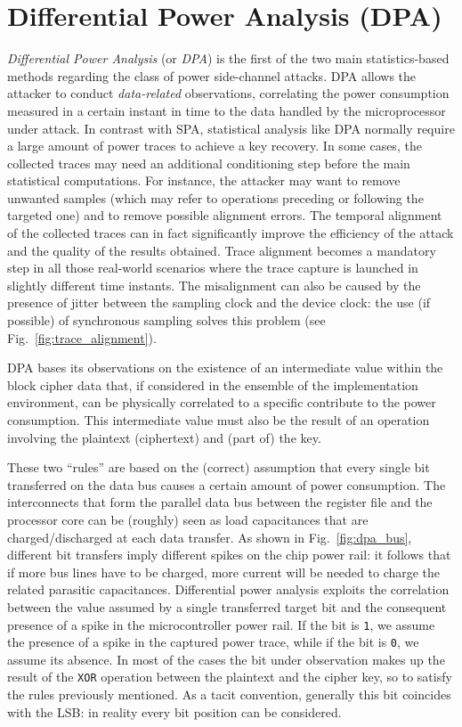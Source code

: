     \section{Differential Power Analysis (DPA)}\label{sec:dpa}
        \emph{Differential Power Analysis} (or \emph{DPA}) is the first of the two main statistics-based methods regarding the class of power side-channel attacks. DPA allows the attacker to conduct \emph{data-related} observations, correlating the power consumption measured in a certain instant in time to the data handled by the microprocessor under attack. In contrast with SPA, statistical analysis like DPA normally require a large amount of power traces to achieve a key recovery. In some cases, the collected traces may need an additional conditioning step before the main statistical computations. For instance, the attacker may want to remove unwanted samples (which may refer to operations preceding or following the targeted one) and to remove possible alignment errors. The temporal alignment of the collected traces can in fact significantly improve the efficiency of the attack and the quality of the results obtained. Trace alignment becomes a mandatory step in all those real-world scenarios where the trace capture is launched in slightly different time instants. The misalignment can also be caused by the presence of jitter between the sampling clock and the device clock: the use (if possible) of synchronous sampling solves this problem (see Fig.~\ref{fig:trace_alignment}).

\bigskip

        \noindent DPA bases its observations on the existence of an intermediate value within the block cipher data that, if considered in the ensemble of the implementation environment, can be physically correlated to a specific contribute to the power consumption. This intermediate value must also be the result of an operation involving the plaintext (ciphertext) and (part of) the key.
        
        These two ``rules'' are based on the (correct) assumption that every single bit transferred on the data bus causes a certain amount of power consumption. The interconnects that form the parallel data bus between the register file and the processor core can be (roughly) seen as load capacitances that are charged/discharged at each data transfer. As shown in Fig.~\ref{fig:dpa_bus}, different bit transfers imply different spikes on the chip power rail: it follows that if more bus lines have to be charged, more current will be needed to charge the related parasitic capacitances. Differential power analysis exploits the correlation between the value assumed by a single transferred target bit and the consequent presence of a spike in the microcontroller power rail. If the bit is \texttt{1}, we assume the presence of a spike in the captured power trace, while if the bit is \texttt{0}, we assume its absence. In most of the cases the bit under observation makes up the result of the \texttt{XOR} operation between the plaintext and the cipher key, so to satisfy the rules previously mentioned. As a tacit convention, generally this bit coincides with the LSB: in reality every bit position can be considered. 

